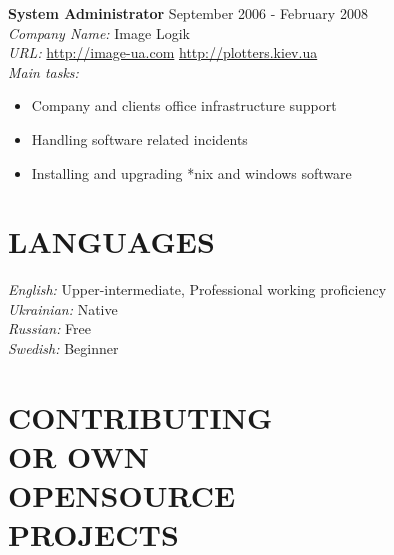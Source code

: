 \documentclass[mymargin,10pt]{res} %
\begin{document}
\begin{resume}
{\bf System Administrator} \hfill September 2006 - February 2008 \\
{\sl Company Name:} Image Logik \\
{\sl URL:} \url{http://image-ua.com} \url{http://plotters.kiev.ua} \\
{\sl Main tasks:}
\begin{itemize}
\item Company and clients office infrastructure support
\item Handling software related incidents
\item Installing and upgrading *nix and windows software
\end{itemize}



\section{LANGUAGES}

{\sl English:} Upper-intermediate, Professional working proficiency \\
{\sl Ukrainian:} Native \\
{\sl Russian:} Free \\
{\sl Swedish:} Beginner \\


\section{CONTRIBUTING \\ OR OWN \\ OPENSOURCE \\ PROJECTS}


\end{resume}
\end{document}
